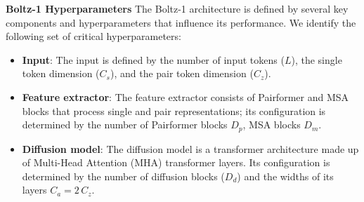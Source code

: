\documentclass{article} %
\renewcommand{\paragraph}[1]{\vspace{1.25mm}\noindent\textbf{#1}}
\begin{document}
\paragraph{Boltz-1 Hyperparameters}
The Boltz-1 architecture is defined by several key components and hyperparameters that influence its performance.
We identify the following set of critical hyperparameters:
\begin{itemize}
    \item \textbf{Input}: The input is defined by the number of input tokens ($L$), the single token dimension ($C_s$), and the pair token dimension ($C_z$).
    \item \textbf{Feature extractor}: The feature extractor consists of Pairformer and MSA blocks that process single and pair representations; its configuration is determined by the number of Pairformer blocks $D_p$, MSA blocks $D_m$.
    \item \textbf{Diffusion model}: The diffusion model is a transformer architecture made up of Multi-Head Attention (MHA) transformer layers. Its configuration is determined by the number of diffusion blocks ($D_d$) and the widths of its layers $C_a = 2\, C_z$.
\end{itemize} 
\end{document}
